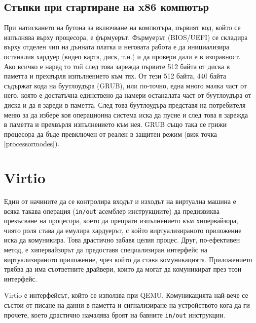   \subsection{Стъпки при стартиране на x86 компютър}
  При натискането на бутона за включване на компютъра, първият код, който се изпълнява върху процесора, е фърмуерът. Фърмуерът (BIOS/UEFI) се складира върху отделен чип на дънната платка и неговата работа е да инициализира останалия хардуер (видео карта, диск, т.н.) и да провери дали е в изправност. Ако всичко е наред то той след това зарежда първите 512 байта от диска в паметта и прехвърля изпълнението към тях. От тези 512 байта, 440 байта съдържат кода на буутлоудъра (GRUB), или по-точно, една много малка част от него, която е достатъчна единствено да намери останалата част от буутлоудъра от диска и да я зареди в паметта. След това буутлоудъра представя на потребителя меню за да избере коя операционна система иска да пусне и след това я зарежда в паметта и прехвърля изпълнението към нея. GRUB също така се грижи процесора да бъде превключен от реален в защитен режим (виж точка \ref{processormodes}).

\section{Virtio}

Един от начините да се контролира входът и изходът на виртуална машина е всяка такава операция ({\tt in/out} асемблер инструкциите) да предизвиква прекъсване на процесора, което да препрати изпълнението към хипервайзора, чиято роля става да емулира хардуерът, с който виртуализираното приложение иска да комуникира. Това драстично забавя целия процес.\cite{vmware-whitepaper} Друг, по-ефективен метод, е хипервайзорът да предоставя специализиран интерфейс на виртуализираното приложение, чрез който да става комуникацията. Приложението трябва да има съответните драйвери, които да могат да комуникират през този интерфейс.

Virtio е интерфейсът, който се използва при QEMU. Комуникацията най-вече се състои от писане на данни в паметта и сигнализиране на устройството кога да ги прочете, което драстично намалява броят на бавните {\tt in/out} инструкции.

